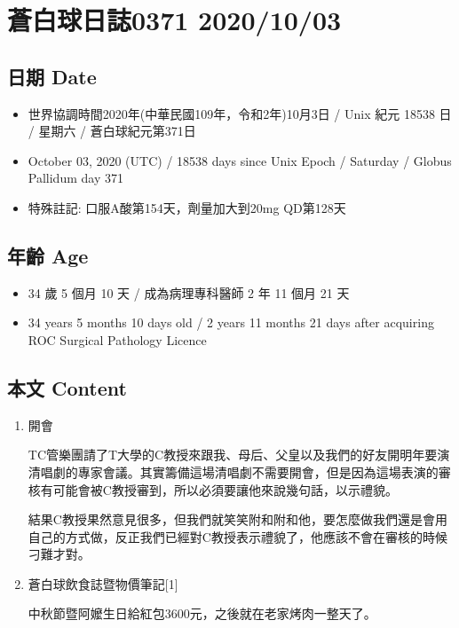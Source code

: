 \documentclass[
]{article}
\providecommand{\tightlist}{%
  \setlength{\itemsep}{0pt}\setlength{\parskip}{0pt}}
\begin{document}
\hypertarget{ux84bcux767dux7403ux65e5ux8a8c0371-20201003}{%
\section{蒼白球日誌0371
2020/10/03}\label{ux84bcux767dux7403ux65e5ux8a8c0371-20201003}}

\hypertarget{ux65e5ux671f-date-2}{%
\subsection{日期 Date}\label{ux65e5ux671f-date-2}}

\begin{itemize}
\tightlist
\item
  世界協調時間2020年(中華民國109年，令和2年)10月3日 / Unix 紀元 18538 日
  / 星期六 / 蒼白球紀元第371日
\item
  October 03, 2020 (UTC) / 18538 days since Unix Epoch / Saturday /
  Globus Pallidum day 371
\item
  特殊註記: 口服A酸第154天，劑量加大到20mg QD第128天
\end{itemize}

\hypertarget{ux5e74ux9f61-age-2}{%
\subsection{年齡 Age}\label{ux5e74ux9f61-age-2}}

\begin{itemize}
\tightlist
\item
  34 歲 5 個月 10 天 / 成為病理專科醫師 2 年 11 個月 21 天
\item
  34 years 5 months 10 days old / 2 years 11 months 21 days after
  acquiring ROC Surgical Pathology Licence
\end{itemize}

\hypertarget{ux672cux6587-content-2}{%
\subsection{本文 Content}\label{ux672cux6587-content-2}}

\begin{enumerate}
\def\labelenumi{\arabic{enumi}.}
\item
  開會

  TC管樂團請了T大學的C教授來跟我、母后、父皇以及我們的好友開明年要演清唱劇的專家會議。其實籌備這場清唱劇不需要開會，但是因為這場表演的審核有可能會被C教授審到，所以必須要讓他來說幾句話，以示禮貌。

  結果C教授果然意見很多，但我們就笑笑附和附和他，要怎麼做我們還是會用自己的方式做，反正我們已經對C教授表示禮貌了，他應該不會在審核的時候刁難才對。
\item
  蒼白球飲食誌暨物價筆記{[}1{]}

  中秋節暨阿嬤生日給紅包3600元，之後就在老家烤肉一整天了。
\end{enumerate}
\end{document}
